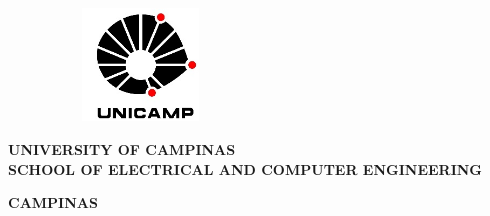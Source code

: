 



\thispagestyle{plain}

\includegraphics[width=7cm, height=3cm,keepaspectratio=true]{imgs/logo}
\begin{center}
  {
  
  \large\textbf{\textsc{UNIVERSITY OF CAMPINAS}}\\
  \large\textbf{\textsc{SCHOOL OF ELECTRICAL AND COMPUTER ENGINEERING}}
  
  }
\end{center}
\vfill
\begin{center}
  {\large\textbf{\textsc{\autor}}}
\end{center}
\vfill
\begin{center}
  {\Large\textbf{\textsc{\titulobr}}}
\end{center}

\vspace{0.5cm}

\begin{center}
  {\Large\textbf{\textsc{\titulo}}}
\end{center}


\vfill


\vspace{4cm}

\vfill
\begin{center}
  \textbf{CAMPINAS \\ \ano}
\end{center}
